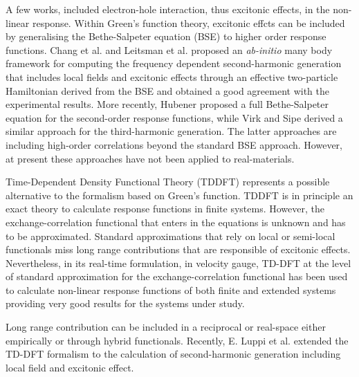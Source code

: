 A few works, included electron-hole interaction, thus excitonic effects, in the non-linear response. Within Green's function theory, excitonic effcts can be included by generalising the Bethe-Salpeter equation (BSE)\cite{strinati} to higher order response functions. Chang et al.\cite{Chang2002} and Leitsman et al.\cite{Leitsmann2005} proposed an \emph{ab-initio} many body framework for computing the frequency dependent second-harmonic generation that includes local fields and excitonic effects through an effective two-particle Hamiltonian derived from the BSE and obtained a good agreement with the experimental results.
More recently, Hubener\cite{PhysRevA.83.062122} proposed a full Bethe-Salpeter equation for the second-order response functions, while Virk and Sipe derived a similar approach for the third-harmonic generation.\cite{PhysRevB.80.165318}
The latter approaches are including high-order correlations beyond the standard BSE approach. However, at present these approaches have not been applied to real-materials. %

Time-Dependent Density Functional Theory (TDDFT)\cite{PhysRevLett.52.997} represents a possible alternative to the formalism based on Green's function. TDDFT is in principle an exact theory to calculate response functions in finite systems. However, the exchange-correlation functional that enters in the equations is unknown and has to be approximated. Standard approximations that rely on local or semi-local functionals miss long range contributions that are responsible of excitonic effects\cite{botti2007time}. Nevertheless, in its real-time formulation, in velocity gauge, TD-DFT at the level of standard approximation for the  exchange-correlation functional has been used to calculate non-linear response functions of both finite and extended systems providing very good results for the systems under study.\cite{takimoto:154114,andrade2007time} %

Long range contribution can be included in a reciprocal or real-space either empirically or through  hybrid functionals.\cite{botti2007time} Recently, E. Luppi et al. extended the TD-DFT formalism to the calculation of second-harmonic generation including local field and excitonic effect.\cite{PhysRevB.82.235201} %
